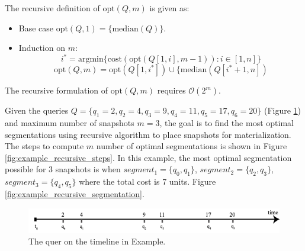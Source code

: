 			The recursive definition of $\mathrm{opt}(Q, m)$ is given as:

			\begin{itemize}
				\item Base case $ \mathrm{opt}(Q, 1) = \{\mathrm{median}(Q)\}$.
				\item Induction on $m$:
				$$i^* = \mathrm{argmin}\{\mathrm{cost}(\mathrm{opt}(Q[1,i], m-1)): i\in[1,
				n]\}$$
				$$
				\mathrm{opt}(Q, m) = \mathrm{opt}(Q[1, i^*]) \cup \{\mathrm{median}(Q[i^*+1, n])
				$$
			\end{itemize}
			The recursive formulation of $\mathrm{opt}(Q, m)$ requires $\mathcal{O}(2^{m})$.

			\begin{example}
				Given the queries $Q=\{q_1=2,q_2=4,q_3=9,q_4=11,q_5=17,q_6=20\}$ (Figure \ref{fig:example_recursive_queries}) and maximum number of snapshots $m=3$, the goal is to find the most optimal segmentations using recursive algorithm to place snapshots for materialization. The steps to compute $m$ number of optimal segmentations is shown in Figure \ref{fig:example_recursive_steps}. In this example, the most optimal segmentation possible for 3 snapshots is when $segment_1 = \{q_0,q_1\}$, $segment_2 = \{q_2,q_3\}$, $segment_3= \{q_4,q_5\}$ where the total cost is 7 units. Figure \ref{fig:example_recursive_segmentation}.
			\label{example:recursive_segmantation}
			\end{example}

			\begin{figure}
				\centering
				\includegraphics[width=\textwidth]{figs/example_recursive_q.pdf}
				\caption{The quer on the timeline in Example.}
				\label{fig:example_recursive_queries}
			\end{figure}

